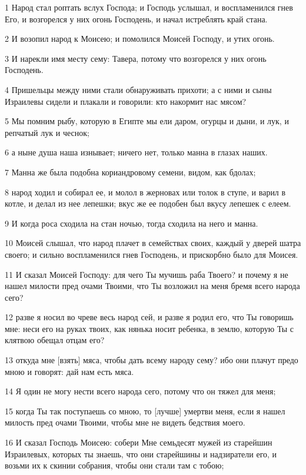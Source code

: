\par 1 Народ стал роптать вслух Господа; и Господь услышал, и воспламенился гнев Его, и возгорелся у них огонь Господень, и начал истреблять край стана.
\par 2 И возопил народ к Моисею; и помолился Моисей Господу, и утих огонь.
\par 3 И нарекли имя месту сему: Тавера, потому что возгорелся у них огонь Господень.
\par 4 Пришельцы между ними стали обнаруживать прихоти; а с ними и сыны Израилевы сидели и плакали и говорили: кто накормит нас мясом?
\par 5 Мы помним рыбу, которую в Египте мы ели даром, огурцы и дыни, и лук, и репчатый лук и чеснок;
\par 6 а ныне душа наша изнывает; ничего нет, только манна в глазах наших.
\par 7 Манна же была подобна кориандровому семени, видом, как бдолах;
\par 8 народ ходил и собирал ее, и молол в жерновах или толок в ступе, и варил в котле, и делал из нее лепешки; вкус же ее подобен был вкусу лепешек с елеем.
\par 9 И когда роса сходила на стан ночью, тогда сходила на него и манна.
\par 10 Моисей слышал, что народ плачет в семействах своих, каждый у дверей шатра своего; и сильно воспламенился гнев Господень, и прискорбно было для Моисея.
\par 11 И сказал Моисей Господу: для чего Ты мучишь раба Твоего? и почему я не нашел милости пред очами Твоими, что Ты возложил на меня бремя всего народа сего?
\par 12 разве я носил во чреве весь народ сей, и разве я родил его, что Ты говоришь мне: неси его на руках твоих, как нянька носит ребенка, в землю, которую Ты с клятвою обещал отцам его?
\par 13 откуда мне [взять] мяса, чтобы дать всему народу сему? ибо они плачут предо мною и говорят: дай нам есть мяса.
\par 14 Я один не могу нести всего народа сего, потому что он тяжел для меня;
\par 15 когда Ты так поступаешь со мною, то [лучше] умертви меня, если я нашел милость пред очами Твоими, чтобы мне не видеть бедствия моего.
\par 16 И сказал Господь Моисею: собери Мне семьдесят мужей из старейшин Израилевых, которых ты знаешь, что они старейшины и надзиратели его, и возьми их к скинии собрания, чтобы они стали там с тобою;
